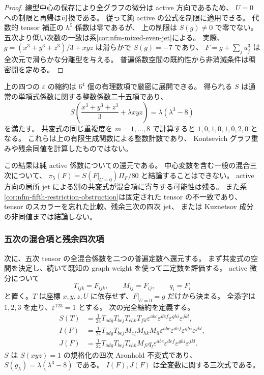 \begin{proof}
線型中心の保存により全グラフの微分は active 方向であるため、
$U=0$ への制限と再帰は可換である。
従って純 active の公式を制限に適用できる。
代数的 tensor 補正の $h^5$ 係数は零であるが、
上の制限は $S(g)\ne0$ で零でない。
五次より低い次数の一致は系\ref{cor:nfm-mixed-even-jet}による。
実際、$g=(x^3+y^3+z^3)/3+xyz$ は滑らかで $S(g)=-7$ であり、
$F=g+\sum_j u_j^3$ は全次元で滑らかな分離型を与える。
普遍係数空間の既約性から非消滅条件は稠密開を定める。
\end{proof}

\begin{remark}[規格化の検算と混合係数]
上の四つの $\varepsilon$ の縮約は $6^4$ 個の有理数項で厳密に展開できる。
得られる $S$ は通常の単項式係数に関する整数係数二十五項であり、
\[
 S\left(\frac{x^3+y^3+z^3}{3}+\lambda xyz\right)
       =\lambda(\lambda^3-8)
\]
を満たす。
共変式の同じ重複度を $m=1,\ldots,8$ で計算すると
$1,0,1,0,1,0,2,0$ となる。
これらは上の有限生成関数による整数計数であり、
Kontsevich グラフ重みや残余同値を計算したものではない。

この結果は純 active 係数についての還元である。
中心変数を含む一般の混合三次について、
$\pi_5(F)=S(F|_{U=0})\Pi_F/80$ と結論することはできない。
active 方向の局所 jet による別の共変式が混合項に寄与する可能性は残る。
また系\ref{cor:nfm-fifth-restriction-obstruction}は固定された tensor の不一致であり、
tensor のスカラーを忘れた比較、残余三次の四次 jet、
または Kuznetsov 成分の非同値までは結論しない。
\end{remark}


\subsubsection{五次の混合項と残余四次項}

次に、五次 tensor の全混合係数を二つの普遍定数へ還元する。
まず共変式の空間を決定し、続いて既知の graph weight を使って二定数を評価する。
active 微分について
\[
 T_{ijk}=F_{ijk},\qquad M_{ij}=F_{ij},\qquad q_i=F_i
\]
と置く。$T$ は座標 $x,y,z,U$ に依存せず、$F|_{U=0}=g$ だけから決まる。
全添字は $1,2,3$ を走り、$\varepsilon^{123}=1$ とする。
次の完全縮約を定義する。
\begin{align*}
 S(T)&=\frac1{24}
 T_{adg}T_{bej}T_{chk}T_{fil}
 \varepsilon^{abc}\varepsilon^{def}\varepsilon^{ghi}\varepsilon^{jkl},\\
 I(F)&=\frac1{24}
 T_{adg}T_{bej}M_{cf}M_{hk}M_{il}
 \varepsilon^{abc}\varepsilon^{def}\varepsilon^{ghi}\varepsilon^{jkl},\\
 J(F)&=\frac1{24}
 T_{adg}T_{bej}T_{chk}M_{fi}q_l
 \varepsilon^{abc}\varepsilon^{def}\varepsilon^{ghi}\varepsilon^{jkl}.
\end{align*}
$S$ は $S(xyz)=1$ の規格化の四次 Aronhold 不変式であり、
$S(g_\lambda)=\lambda(\lambda^3-8)$ である。
$I(F),J(F)$ は全変数に関する三次式である。

